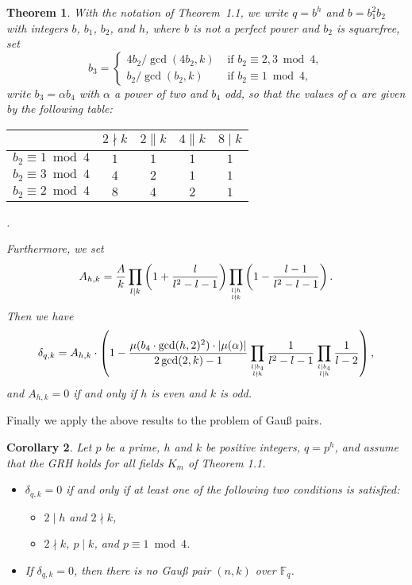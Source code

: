 \documentclass[twoside,final,reqno,noamsfonts]{birkartspecial}
\newtheorem{theorem}{Theorem}[section]
\newtheorem{corollary}[theorem]{Corollary}
\begin{document}
\begin{theorem} With  the notation of Theorem~1.1, we write
$q=b^h$  and $b=b^{2}_{1} b_{2}$ with integers
$b$, $b_{1}$, $b_{2}$, and $h$, where $b$ is not a perfect power and
 $b_2$ is squarefree,  set
$$b_3=\begin{cases} 4b_2/\gcd(4b_2,k) & \text{ if } b_2\equiv 2,3 \bmod 4,\\
b_2/\gcd(b_2,k) & \text{ if } b_2\equiv 1 \bmod 4, \end{cases} $$
write $ b_3=\alpha b_4$ with $\alpha$ a power of two and $b_4$
odd, so that the values of $\alpha$ are given by the following
table:
\begin{center}
\begin{tabular}{|c|c|c|c|c|}
\hline
                        & $2\nmid k$ & $2\| k$ & $4\| k$ & $8\mid k$ \\
\hline
 $b_2\equiv 1\bmod 4$ &    $1$     &   $1$   &   $1$   &    $1$    \\
\hline
 $b_2\equiv 3 \bmod 4$ &    $4$     &   $2$   &   $1$   &    $1$    \\
\hline
 $b_2\equiv 2 \bmod 4$ &    $8$     &   $4$   &   $2$   &    $1$  \\
\hline
\end{tabular}
.
\end{center}
Furthermore, we set
$$A_{h,k}=\frac{A}{k}\prod_{l \mid k}
\left(1+\frac{l}{l^2-l-1}\right)
\prod_{\genfrac{}{}{0pt}{}{l\mid h}{l\nmid k}}
\left(1-\frac{l-1}{l^2- l-1}\right).$$
Then we have
\begin{equation}\label{density}
\delta_{q,k}=A_{h,k}\cdot\left(1-\frac{\mu(b_4\cdot\gcd(h,2)^2)\cdot |\mu(\alpha)|}
{2 \gcd (2,k)-1}\prod_{\genfrac{}{}{0pt}{}{l\mid b_4}{l\nmid h}}\frac{1}{l^2-l-1}
\prod_{\genfrac{}{}{0pt}{}{l\mid b_4}{l\mid h}}\frac{1}{l-2}\right),
\end{equation}
and $A_{h,k}=0$ if and only if $h$ is even and $k$ is odd.
\end{theorem}

Finally we apply the above results to  the problem of Gau{\ss} pairs.

\begin{corollary}\label{integers}
Let $p$ be a prime, $h$ and $k$ be positive integers,
$q=p^{h}$, and assume that the GRH holds for all fields $K_{m}$  of
Theorem 1.1.
\begin{itemize}
\item [(i)] $\delta_{q,k}= 0$ if and only if at least one of the
following two conditions is satisfied:
  \begin{itemize}
  \item [(a)] $2 \mid h$ and $2\nmid k$,
  \item [(b)] $2\nmid k$, $p \mid k$, and $p\equiv 1\bmod 4$.
  \end{itemize}
\item [(ii)] If $\delta_{q,k}=0$, then there is no Gau{\ss} pair
$(n,k)$  over ${\mathbb F}_{q}$.
\end{itemize}
\end{corollary}
\end{document}
